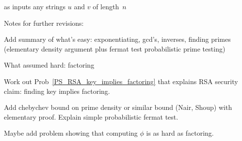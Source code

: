 as inputs any strings $u$ and $v$ of length~$n$ \fi

\begin{problems}
\classproblems
{}
\end{problems}

\begin{editingnotes}
Notes for further revisions:

Add summary of what's easy: exponentiating, gcd's, inverses, finding primes (elementary
density argument plus fermat test probabilistic prime testing)

What assumed hard: factoring

Work out Prob~\ref{PS_RSA_key_implies_factoring} that explains RSA security claim: finding
key implies factoring.

Add chebychev bound on prime density or similar bound (Nair, Shoup) with elementary proof.
Explain simple probabilistic fermat test.

Maybe add problem showing that computing $\phi$ is as hard as factoring.
\end{editingnotes}

\endinput
